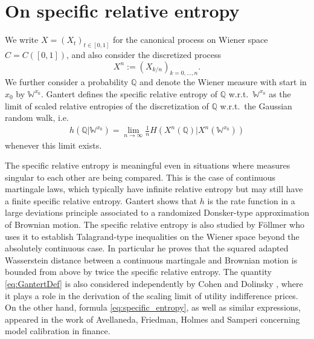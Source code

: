 \documentclass[reqno, a4paper]{amsart}
\theoremstyle{remark}
\newcommand{\Q}{\mathbb{Q}}
\newcommand{\WW}{{\mathbb W}}
\newcommand{\1}{\mathbbm 1}
\numberwithin{equation}{section}
\numberwithin{theorem}{section}
\begin{document}
\section{On specific relative entropy}

We write $X=(X_t)_{ t \in [0,1]} $ for the canonical process on Wiener space $C=C([0,1])$, and also consider the discretized process
$$X^n:=(X_{k/n})_{k=0, \ldots, n}.$$ We further consider  a probability $\Q$ and denote the Wiener measure with start in $x_0$ by $\WW^{x_0}$. Gantert \cite{Ga91} defines the specific relative entropy of $\Q$ w.r.t.\ 
$\WW^{x_0}$ as the limit of scaled relative entropies of the discretization of $\Q$  w.r.t.\ the Gaussian random walk, i.e.\
\begin{align}\label{eq:GantertDef}
h(\Q|\WW^{x_0})=\lim_{n\to \infty} \frac{1}n H(X^n(\Q)|X^n(\WW^{x_0})) 
\end{align}
whenever this limit exists. 

The specific relative entropy is meaningful even in situations where measures singular to each other are being compared. This is the case of continuous martingale laws, which typically have infinite relative entropy but may still have a finite specific relative entropy. Gantert \cite[Kapitel II.4]{Ga91} shows that $h$ is the rate function in a large deviations principle associated to a randomized Donsker-type approximation of Brownian motion. The specific relative entropy is also studied by F\"ollmer \cite{Fo22a, Fo22b} who uses it to establish Talagrand-type inequalities on the Wiener space beyond the absolutely continuous case. In particular he proves that the squared adapted Wasserstein distance between a continuous martingale and Brownian motion is bounded from above by twice the specific relative entropy. {The quantity \eqref{eq:GantertDef} is also considered independently by Cohen and Dolinsky \cite{CoDo22}, where it plays a role in the derivation of the  scaling limit of utility indifference prices. On the other hand, formula \eqref{eq:specific_entropy}, as well as similar expressions, appeared in the work of Avellaneda, Friedman, Holmes and Samperi \cite{Av01} concerning model calibration in finance.} 
\end{document}

